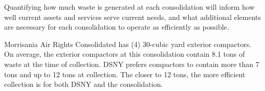 
    Quantifying how much waste is generated at each consolidation will inform how well current assets and services serve current needs, and what additional elements are necessary for each consolidation to operate as efficiently as possible.
    
    Morrisania Air Rights Consolidated has (4) 30-cubic yard exterior compactors. On average, the exterior compactors at this consolidation contain 8.1 tons of waste at the time of collection. DSNY prefers compactors to contain more than 7 tons and up to 12 tons at collection. The closer to 12 tons, the more efficient collection is for both DSNY and the consolidation.